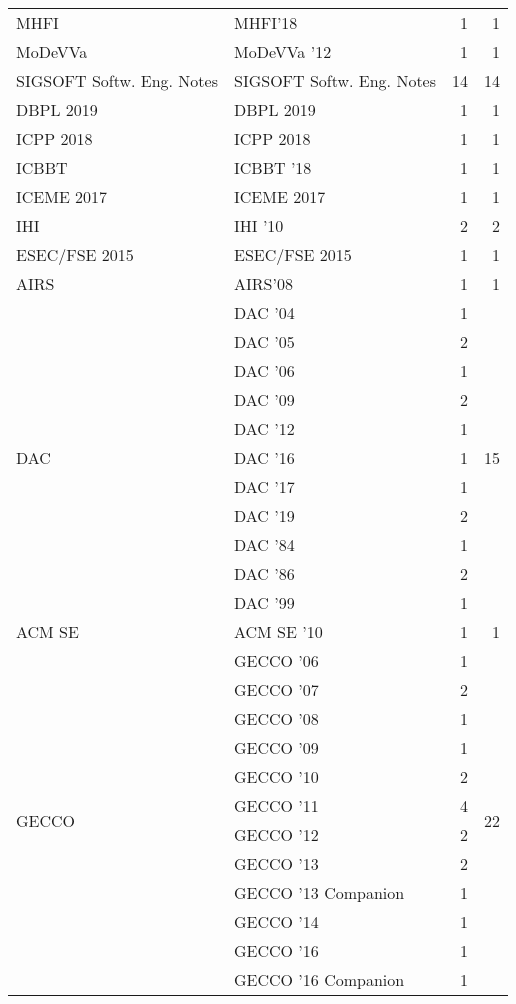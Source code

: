 \begin{table*}[t]
\begin{tabular}{llrr}
\multirow{1}{*}{MHFI} & MHFI'18 & 1 & \multirow{1}{*}{1}\\
\multirow{1}{*}{MoDeVVa } & MoDeVVa '12 & 1 & \multirow{1}{*}{1}\\
\multirow{1}{*}{SIGSOFT Softw. Eng. Notes} & SIGSOFT Softw. Eng. Notes & 14 & \multirow{1}{*}{14}\\
\multirow{1}{*}{DBPL 2019} & DBPL 2019 & 1 & \multirow{1}{*}{1}\\
\multirow{1}{*}{ICPP 2018} & ICPP 2018 & 1 & \multirow{1}{*}{1}\\
\multirow{1}{*}{ICBBT } & ICBBT '18 & 1 & \multirow{1}{*}{1}\\
\multirow{1}{*}{ICEME 2017} & ICEME 2017 & 1 & \multirow{1}{*}{1}\\
\multirow{1}{*}{IHI } & IHI '10 & 2 & \multirow{1}{*}{2}\\
\multirow{1}{*}{ESEC/FSE 2015} & ESEC/FSE 2015 & 1 & \multirow{1}{*}{1}\\
\multirow{1}{*}{AIRS} & AIRS'08 & 1 & \multirow{1}{*}{1}\\
\multirow{11}{*}{DAC } & DAC '04 & 1 & \multirow{11}{*}{15}\\
& DAC '05 & 2 &\\
& DAC '06 & 1 &\\
& DAC '09 & 2 &\\
& DAC '12 & 1 &\\
& DAC '16 & 1 &\\
& DAC '17 & 1 &\\
& DAC '19 & 2 &\\
& DAC '84 & 1 &\\
& DAC '86 & 2 &\\
& DAC '99 & 1 &\\
\multirow{1}{*}{ACM SE } & ACM SE '10 & 1 & \multirow{1}{*}{1}\\
\multirow{14}{*}{GECCO } & GECCO '06 & 1 & \multirow{14}{*}{22}\\
& GECCO '07 & 2 &\\
& GECCO '08 & 1 &\\
& GECCO '09 & 1 &\\
& GECCO '10 & 2 &\\
& GECCO '11 & 4 &\\
& GECCO '12 & 2 &\\
& GECCO '13 & 2 &\\
& GECCO '13 Companion & 1 &\\
& GECCO '14 & 1 &\\
& GECCO '16 & 1 &\\
& GECCO '16 Companion & 1 &\\

\end{tabular}
\end{table*}
